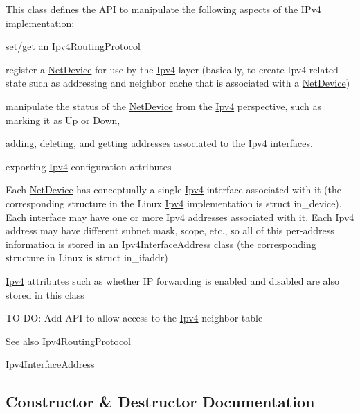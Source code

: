 This class defines the A\+PI to manipulate the following aspects of the I\+Pv4 implementation\+:
\begin{DoxyEnumerate}
\item set/get an \hyperlink{classns3_1_1Ipv4RoutingProtocol}{Ipv4\+Routing\+Protocol}
\item register a \hyperlink{classns3_1_1NetDevice}{Net\+Device} for use by the \hyperlink{classns3_1_1Ipv4}{Ipv4} layer (basically, to create Ipv4-\/related state such as addressing and neighbor cache that is associated with a \hyperlink{classns3_1_1NetDevice}{Net\+Device})
\item manipulate the status of the \hyperlink{classns3_1_1NetDevice}{Net\+Device} from the \hyperlink{classns3_1_1Ipv4}{Ipv4} perspective, such as marking it as Up or Down,
\item adding, deleting, and getting addresses associated to the \hyperlink{classns3_1_1Ipv4}{Ipv4} interfaces.
\item exporting \hyperlink{classns3_1_1Ipv4}{Ipv4} configuration attributes
\end{DoxyEnumerate}

Each \hyperlink{classns3_1_1NetDevice}{Net\+Device} has conceptually a single \hyperlink{classns3_1_1Ipv4}{Ipv4} interface associated with it (the corresponding structure in the Linux \hyperlink{classns3_1_1Ipv4}{Ipv4} implementation is struct in\+\_\+device). Each interface may have one or more \hyperlink{classns3_1_1Ipv4}{Ipv4} addresses associated with it. Each \hyperlink{classns3_1_1Ipv4}{Ipv4} address may have different subnet mask, scope, etc., so all of this per-\/address information is stored in an \hyperlink{classns3_1_1Ipv4InterfaceAddress}{Ipv4\+Interface\+Address} class (the corresponding structure in Linux is struct in\+\_\+ifaddr)

\hyperlink{classns3_1_1Ipv4}{Ipv4} attributes such as whether IP forwarding is enabled and disabled are also stored in this class

TO DO\+: Add A\+PI to allow access to the \hyperlink{classns3_1_1Ipv4}{Ipv4} neighbor table

\begin{DoxySeeAlso}{See also}
\hyperlink{classns3_1_1Ipv4RoutingProtocol}{Ipv4\+Routing\+Protocol} 

\hyperlink{classns3_1_1Ipv4InterfaceAddress}{Ipv4\+Interface\+Address} 
\end{DoxySeeAlso}


\subsection{Constructor \& Destructor Documentation}

